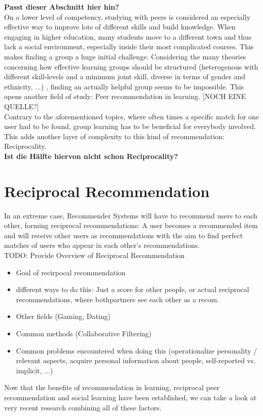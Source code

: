 \documentclass[nochapterpage,bigchapter,linedtoc,longdoc,colorback,accentcolor=tud3b,oneside]{tudreport}
\begin{document}
\textbf{Passt dieser Abschnitt hier hin?}\\
On a lower level of competency, studying with peers is considered an especially effective way to improve lots of different skills and build knowledge. \cite{maxwell2008learning} When engaging in higher education, many students move to a different town and thus lack a social environment, especially inside their most complicated courses. This makes finding a group a huge initial challenge. Considering the many theories concerning how effective learning groups should be structured (heterogenous with different skill-levels and a minimum joint skill, diverse in terms of gender and ethnicity, ...) \cite{manske2015using, blumenfeld1996learning}, finding an actually helpful group seems to be impossible. This opens another field of study: Peer recommendation in learning. \cite{potts2018reciprocal, olakanmi2017group} [NOCH EINE QUELLE?]\\
Contrary to the aforementioned topics, where often times a specific match for one user had to be found, group learning has to be beneficial for everybody involved. This adds another layer of complexity to this kind of recommendation: Reciprocality.\\
\textbf{Ist die Hälfte hiervon nicht schon Reciprocality?}

\section{Reciprocal Recommendation}
In an extreme case, Recommender Systems will have to recommend users to each other, forming reciprocal recommendations: A user becomes a recommended item and will receive other users as recommendations with the aim to find perfect matches of users who appear in each other's recommendations.\\
TODO: Provide Overview of Reciprocal Recommendation\\
\begin{itemize}
	\item Goal of recirpocal recommendation
	\item different ways to do this: Just a score for other people, or actual reciprocal recommendations, where bothpartners see each other as a recom.
	\item Other fields (Gaming, Dating)
	\item Common methods (Collaborative Filtering)
	\item Common problems encountered when doing this (operationalize personality / relevant aspects, acquire personal information about people, self-reported vs. implicit, ...)
\end{itemize}
Now that the benefits of recommendation in learning, reciprocal peer recommendation and social learning have been established, we can take a look at very recent research combining all of these factors.\\
\end{document}
